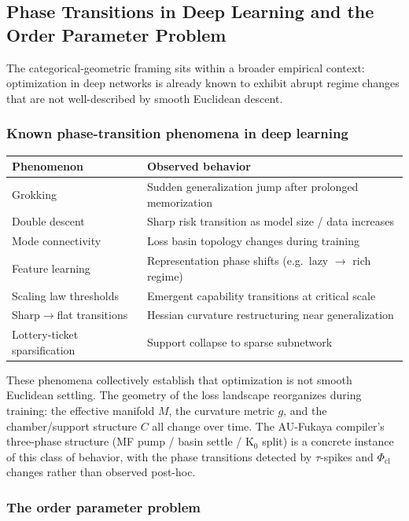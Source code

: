 \documentclass[11pt]{amsart}
\begin{document}
\subsection{Phase Transitions in Deep Learning and the Order Parameter Problem}
\label{sec:phase_transitions}

The categorical-geometric framing sits within a broader empirical
context: optimization in deep networks is already known to exhibit
abrupt regime changes that are not well-described by smooth Euclidean
descent.

\subsubsection*{Known phase-transition phenomena in deep learning}

\begin{center}
\small
\begin{tabular}{@{}lp{7cm}@{}}
\toprule
Phenomenon & Observed behavior \\
\midrule
Grokking & Sudden generalization jump after prolonged memorization \\
Double descent & Sharp risk transition as model size / data increases \\
Mode connectivity & Loss basin topology changes during training \\
Feature learning & Representation phase shifts (e.g.\ lazy $\to$ rich regime) \\
Scaling law thresholds & Emergent capability transitions at critical scale \\
Sharp$\to$flat transitions & Hessian curvature restructuring near generalization \\
Lottery-ticket sparsification & Support collapse to sparse subnetwork \\
\bottomrule
\end{tabular}
\end{center}

These phenomena collectively establish that optimization is not smooth
Euclidean settling.
The geometry of the loss landscape reorganizes during training:
the effective manifold $M$, the curvature metric $g$, and the
chamber/support structure $C$ all change over time.
The AU-Fukaya compiler's three-phase structure (MF pump / basin settle
/ K$_0$ split) is a concrete instance of this class of behavior,
with the phase transitions detected by $\tau$-spikes and
$\Phi_\mathrm{cl}$ changes rather than observed post-hoc.

\subsubsection*{The order parameter problem}
\end{document}
